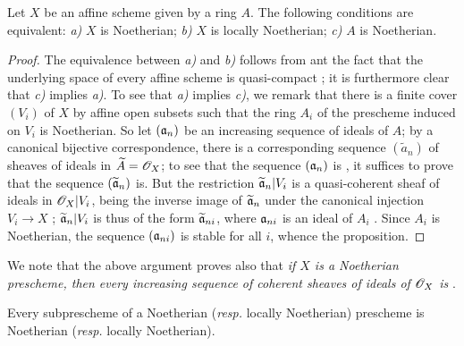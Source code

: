 \begin{prop}[6.1.3]
\label{1.6.1.3}
Let $X$ be an affine scheme given by a ring $A$.
The following conditions are equivalent:
\emph{a)} $X$ is Noetherian;
\emph{b)} $X$ is locally Noetherian;
\emph{c)} $A$ is Noetherian.
\end{prop}

\begin{proof}
\label{proof-1.6.1.3}
The equivalence between \emph{a)} and \emph{b)} follows from  ant the fact that the underlying space of every affine scheme is quasi-compact ;
it is furthermore clear that \emph{c)} implies \emph{a)}.
To see that \emph{a)} implies \emph{c)}, we remark that there is a finite cover $(V_i)$ of $X$ by affine open subsets such that the ring $A_i$ of the prescheme induced on $V_i$ is Noetherian.
So let $(\mathfrak{a}_n)$ be an increasing sequence of ideals of $A$;
by a canonical bijective correspondence, there is a corresponding sequence $(\widetilde{a}_n)$ of sheaves of ideals in $\widetilde{A}=\mathscr{O}_X$;
to see that the sequence $(\mathfrak{a}_n)$ is , it suffices to prove that the sequence $(\widetilde{\mathfrak{a}}_n)$ is.
But the restriction $\widetilde{\mathfrak{a}}_n|V_i$ is a quasi-coherent sheaf of ideals in $\mathscr{O}_X|V_i$, being the inverse image of $\widetilde{\mathfrak{a}}_n$ under the canonical injection $V_i\to X$ ;
$\widetilde{\mathfrak{a}}_n|V_i$ is thus of the form $\widetilde{\mathfrak{a}}_{ni}$, where $\mathfrak{a}_{ni}$ is an ideal of $A_i$ .
Since $A_i$ is Noetherian, the sequence $(\mathfrak{a}_{ni})$ is stable for all $i$, whence the proposition.
\end{proof}

We note that the above argument proves also that \emph{if $X$ is a Noetherian prescheme, then every increasing sequence of coherent sheaves of ideals of $\mathscr{O}_X$ is }.

\begin{prop}[6.1.4]
\label{1.6.1.4}
Every subprescheme of a Noetherian (\emph{resp.} locally Noetherian) prescheme is Noetherian (\emph{resp.} locally Noetherian).
\end{prop}

